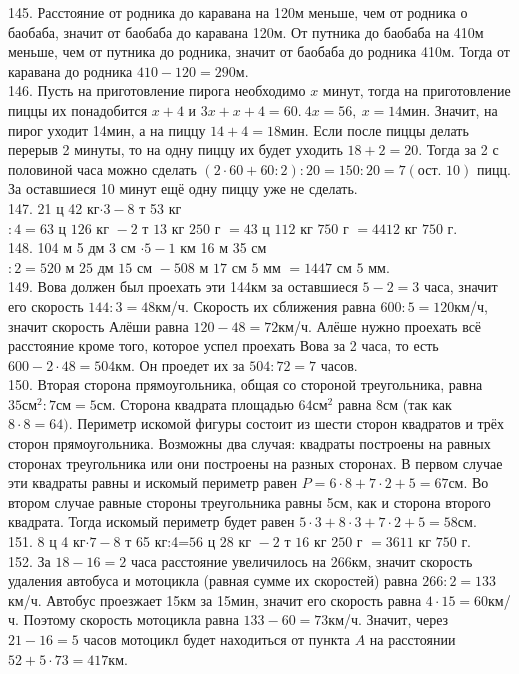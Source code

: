 \documentclass[12pt]{article}
\begin{document}
145. Расстояние от родника до каравана на 120м меньше, чем от родника о баобаба, значит от баобаба до каравана 120м. От путника до баобаба на 410м меньше, чем от путника до родника, значит от баобаба до родника 410м. Тогда от каравана до родника $410-120=290$м.\\
146. Пусть на приготовление пирога необходимо $x$ минут, тогда на приготовление пиццы их понадобится $x+4$ и $3x+x+4=60.\ 4x=56,\ x=14$мин. Значит, на пирог уходит 14мин, а на пиццу $14+4=18$мин. Если после пиццы делать перерыв 2 минуты, то на одну пиццу их будет уходить $18+2=20.$ Тогда за 2 с половиной часа можно сделать $(2\cdot60+60:2):20=150:20=7 (\text{ост. 10})$ пицц. За оставшиеся 10 минут ещё одну пиццу уже не сделать.\\
147. 21 ц 42 кг$\cdot3-8$ т 53 кг$:4=63\text{ ц }126\text{ кг }-2\text{ т }13\text{ кг }250\text{ г }=43\text{ ц }112\text{ кг }750\text{ г }=4412\text{ кг }750\text{ г}.$\\
148. 104 м 5 дм 3 см $\cdot 5-1$ км 16 м 35 см$:2=520\text{ м }25\text{ дм }15\text{ см }-508\text{ м }17\text{ см }5\text{ мм }=1447\text{ см }5\text{ мм}.$\\
149. Вова должен был проехать эти 144км за оставшиеся $5-2=3$ часа, значит его скорость $144:3=48$км/ч. Скорость их сближения равна $600:5=120$км/ч, значит скорость Алёши равна $120-48=72$км/ч. Алёше нужно проехать всё расстояние кроме того, которое успел проехать Вова за 2 часа, то есть $600-2\cdot48=504$км. Он проедет их за $504:72=7$ часов.\\
150. Вторая сторона прямоугольника, общая со стороной треугольника, равна $35\text{см}^2:7\text{см}=5$см. Сторона квадрата площадью $64\text{см}^2$ равна 8см (так как $8\cdot8=64).$ Периметр искомой фигуры состоит из шести сторон квадратов и трёх сторон прямоугольника. Возможны два случая: квадраты построены на равных сторонах треугольника или они построены на разных сторонах. В первом случае эти квадраты равны и искомый периметр равен $P=6\cdot8+7\cdot2+5=67$см. Во втором случае равные стороны треугольника равны 5см, как и сторона второго квадрата. Тогда искомый периметр будет равен $5\cdot3+8\cdot3+7\cdot2+5=58$см.\\
151. 8 ц 4 кг$\cdot7-8$ т 65 кг:4=$56\text{ ц }28\text{ кг }-2\text{ т }16\text{ кг }250\text{ г }=3611\text{ кг }750\text{ г.}$\\
152. За $18-16=2$ часа расстояние увеличилось на 266км, значит скорость удаления автобуса и мотоцикла (равная сумме их скоростей) равна $266:2=133$км/ч. Автобус проезжает 15км за 15мин, значит его скорость равна $4\cdot15=60$км/ч. Поэтому скорость мотоцикла равна $133-60=73$км/ч. Значит, через $21-16=5$ часов мотоцикл будет находиться от пункта $A$ на расстоянии $52+5\cdot73=417$км.\\
\end{document}
